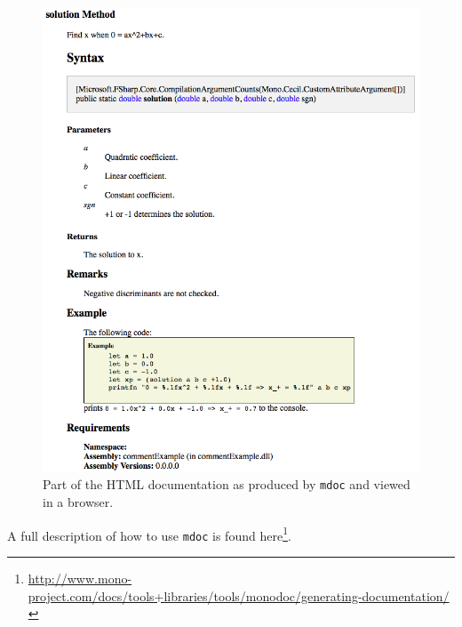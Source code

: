 \documentclass[fsharpnotes.tex]{subfiles}
\begin{document}
\begin{figure}
  \centering
  \includegraphics[width=\linewidth]{mdocOutput}
  \caption{Part of the HTML documentation as produced by \lstinline[language=console]{mdoc} and viewed in a browser.}
  \label{fig:htmlDocumentExample}
\end{figure}
A full description of how to use \lstinline[language=console]{mdoc} is found here\footnote{\url{http://www.mono-project.com/docs/tools+libraries/tools/monodoc/generating-documentation/}}.
\end{document}
